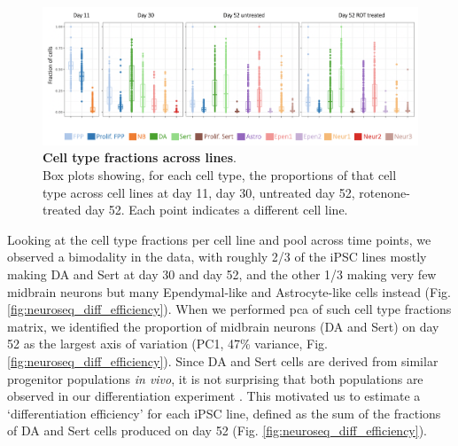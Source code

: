 \begin{figure}[h]
\includegraphics[width=15.5cm]{Chapter5/Fig/neuroseq_line_celltype.png}
\caption[Cell type fractions across lines]{\textbf{Cell type fractions across lines}.\\
Box plots showing, for each cell type, the proportions of that cell type across cell lines at day 11, day 30, untreated day 52, rotenone-treated day 52. 
Each point indicates a different cell line.}
\label{fig:neuroseq_line_variation}
\end{figure}


Looking at the cell type fractions per cell line and pool across time points, we observed a bimodality in the data, with roughly 2/3 of the iPSC lines mostly making DA and Sert at day 30 and day 52, and the other 1/3 making very few midbrain neurons but many Ependymal-like and Astrocyte-like cells instead (Fig. \ref{fig:neuroseq_diff_efficiency}).
When we performed \gls{pca} of such cell type fractions matrix, we identified the proportion of midbrain neurons (DA and Sert) on day 52 as the largest axis of variation (PC1, 47\% variance, Fig. \ref{fig:neuroseq_diff_efficiency}). 
Since DA and Sert cells are derived from similar progenitor populations \textit{in vivo}, it is not surprising that both populations are observed in our differentiation experiment \cite{ye1998fgf, cao2017characterization}. 
This motivated us to estimate a `differentiation efficiency' for each iPSC line, defined as the sum of the fractions of DA and Sert cells produced on day 52 (Fig. \ref{fig:neuroseq_diff_efficiency}). 
\\

